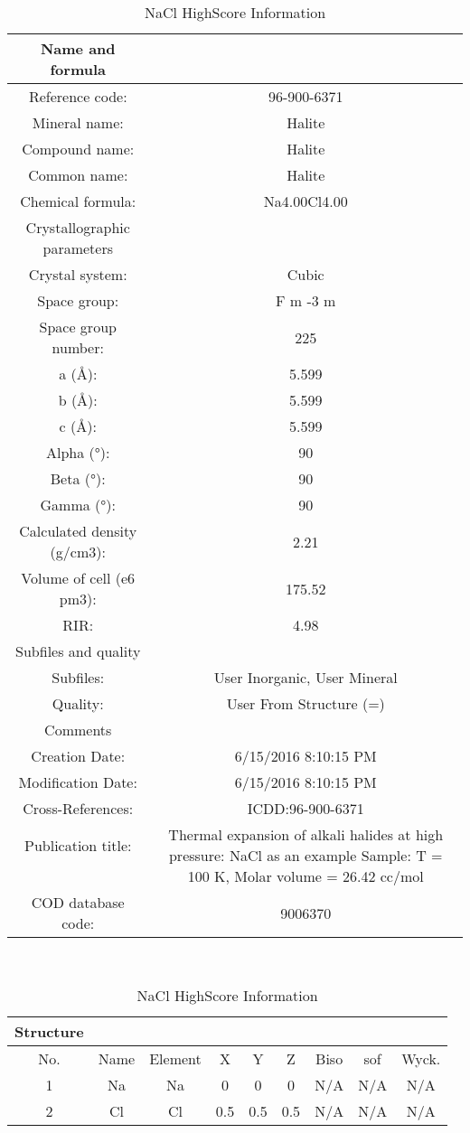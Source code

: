 \documentclass[11pt]{article}
\begin{document}
	\begin{table}[htbp]
		\centering
		\caption{NaCl HighScore Information}
		\begin{tabular}{cc}
			\toprule
			Name and formula &  \\
			\midrule
			Reference code: & 96-900-6371 \\
			Mineral name: & Halite \\
			Compound name: & Halite \\
			Common name: & Halite \\
			Chemical formula: & Na4.00Cl4.00 \\
			\midrule
			Crystallographic parameters &  \\
			\midrule
			Crystal system: & Cubic \\
			Space group: & F m -3 m \\
			Space group number: & 225 \\
			a (Å): & 5.599 \\
			b (Å): & 5.599 \\
			c (Å): & 5.599 \\
			Alpha (°): & 90 \\
			Beta (°): & 90 \\
			Gamma (°): & 90 \\
			Calculated density (g/cm3): & 2.21 \\
			Volume of cell (e6 pm3): & 175.52 \\
			RIR: & 4.98 \\
			\midrule
			Subfiles and quality &  \\
			\midrule
			Subfiles: & User Inorganic, User Mineral \\
			Quality: & User From Structure (=) \\
			Comments &  \\
			Creation Date: & 6/15/2016 8:10:15 PM \\
			Modification Date: & 6/15/2016 8:10:15 PM \\
			Cross-References: & ICDD:96-900-6371 \\
			Publication title: & \multirow{3}{*}{\parbox{7cm}{Thermal expansion of alkali halides at high pressure: NaCl as an example  Sample: T = 100 K, Molar volume = 26.42 cc/mol}} \\
			& \\
			& \\
			COD database code: & 9006370 \\
			\bottomrule
		\end{tabular}%
		\\
		\begin{tabular}{ccccccccc}
			\toprule
			Structure &   &   &   &   &   &   &   &  \\
			\midrule
			No. & Name & Element & X & Y & Z & Biso & sof & Wyck. \\
			\midrule
			1 & Na & Na & 0 & 0 & 0 & N/A & N/A & N/A \\
			2 & Cl & Cl & 0.5 & 0.5 & 0.5 & N/A & N/A & N/A \\
			\bottomrule
		\end{tabular}%
		\label{tab:NaCl_Appendix}%
	\end{table}%
	
\end{document}
